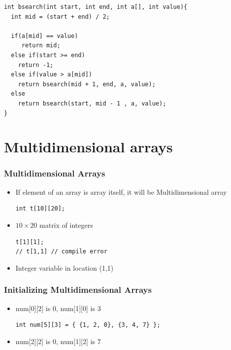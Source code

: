 \documentclass{../c-lecture}
\begin{document}
\begin{frame}[fragile]
  \scriptsize
  \begin{verbatim}
int bsearch(int start, int end, int a[], int value){
  int mid = (start + end) / 2;

  if(a[mid] == value)
     return mid;
  else if(start >= end)
    return -1;
  else if(value > a[mid])
    return bsearch(mid + 1, end, a, value);
  else
    return bsearch(start, mid - 1 , a, value);
}
  \end{verbatim}
\end{frame}

\section{Multidimensional arrays}

\begin{frame}[fragile]
  \frametitle{Multidimensional Arrays}
  \begin{itemize}
    \item
      If element of an array is array itself, it will be Multidimensional array

    \begin{verbatim}
int t[10][20];
    \end{verbatim}
    \item $10 \times 20$ matrix of integers
    \begin{verbatim}
t[1][1];
// t[1,1] // compile error
    \end{verbatim}
    \item Integer variable in location (1,1)
  \end{itemize}
\end{frame}

\begin{frame}[fragile]
  \frametitle{Initializing Multidimensional Arrays}
  \begin{itemize}
    \begin{verbatim}
int num[2][3] = {1, 2, 0, 3, 4, 7};
int num[2][3] = { {1, 2, 0}, {3, 4, 7} };
    \end{verbatim}
    \item num[0][2] is 0, num[1][0] is 3
    \begin{verbatim}
int num[5][3] = { {1, 2, 0}, {3, 4, 7} };
    \end{verbatim}
    \item num[2][2] is 0, num[1][2] is 7
  \end{itemize}
\end{frame}
\end{document}
